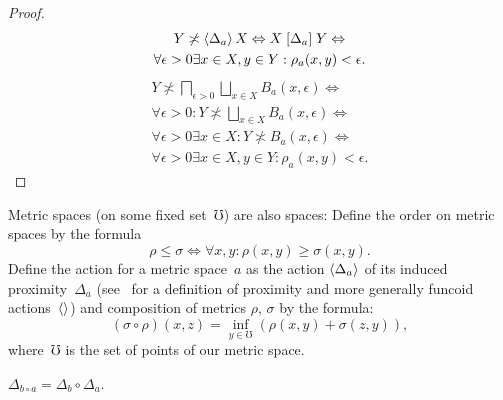 \begin{proof}
\begin{multline*}
Y\not\asymp\left\langle \Delta_a\right\rangle X\Leftrightarrow X\mathrel{\left[\Delta_a\right]}Y \Leftrightarrow \\ \forall\epsilon>0\exists x\in X,y\in Y:\rho_a(x,y)<\epsilon.
\end{multline*}
\begin{multline*}
Y\nasymp\bigsqcap_{\epsilon>0}\bigsqcup_{x\in X}B_a(x,\epsilon) \Leftrightarrow \\ \forall\epsilon>0:Y\nasymp\bigsqcup_{x\in X}B_a(x,\epsilon) \Leftrightarrow \\
\forall\epsilon>0\exists x\in X:Y\nasymp B_a(x,\epsilon) \Leftrightarrow \\
\forall\epsilon>0\exists x\in X,y\in Y:\rho_a(x,y)<\epsilon.
\end{multline*}
\end{proof}


Metric spaces (on some fixed set~$\mho$) are also spaces: Define the order on metric spaces by the formula \[ \rho\leq\sigma \Leftrightarrow \forall x,y:\rho(x,y)\geq\sigma(x,y). \] Define the action for a metric space~$a$ as the action $\left\langle \Delta_a\right\rangle$ of its induced proximity~$\Delta_a$ (see~\cite{volume-1} for a definition of proximity and more generally funcoid actions~$\left\langle \right\rangle$) and composition of metrics $\rho$, $\sigma$ by the formula: \[ (\sigma\circ\rho)(x,z) = \inf_{y\in\mho}(\rho(x,y)+\sigma(z,y)), \]
where~$\mho$ is the set of points of our metric space.

\begin{lem}
$\Delta_{b\circ a} = \Delta_b\circ\Delta_a$.
\end{lem}


